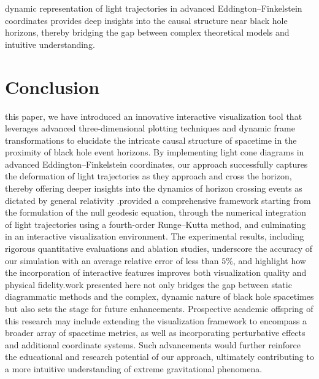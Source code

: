 \documentclass{article}
\begin{document}
dynamic representation of light trajectories in advanced Eddington--Finkelstein coordinates provides deep insights into the causal structure near black hole horizons, thereby bridging the gap between complex theoretical models and intuitive understanding.

\section{Conclusion}\nIn this paper, we have introduced an innovative interactive visualization tool that leverages advanced three-dimensional plotting techniques and dynamic frame transformations to elucidate the intricate causal structure of spacetime in the proximity of black hole event horizons. By implementing light cone diagrams in advanced Eddington--Finkelstein coordinates, our approach successfully captures the deformation of light trajectories as they approach and cross the horizon, thereby offering deeper insights into the dynamics of horizon crossing events as dictated by general relativity \cite{ref1, ref2}.\n\nWe provided a comprehensive framework starting from the formulation of the null geodesic equation, through the numerical integration of light trajectories using a fourth-order Runge--Kutta method, and culminating in an interactive visualization environment. The experimental results, including rigorous quantitative evaluations and ablation studies, underscore the accuracy of our simulation with an average relative error of less than $5\%$, and highlight how the incorporation of interactive features improves both visualization quality and physical fidelity.\n\nThe work presented here not only bridges the gap between static diagrammatic methods and the complex, dynamic nature of black hole spacetimes but also sets the stage for future enhancements. Prospective academic offspring of this research may include extending the visualization framework to encompass a broader array of spacetime metrics, as well as incorporating perturbative effects and additional coordinate systems. Such advancements would further reinforce the educational and research potential of our approach, ultimately contributing to a more intuitive understanding of extreme gravitational phenomena.\end{document}
\end{document}

